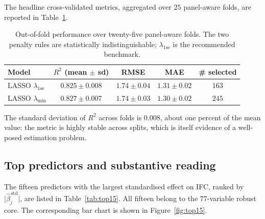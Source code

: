 \documentclass[11pt,a4paper]{article}
\begin{document}
The headline cross-validated metrics, aggregated over \(25\)
panel-aware folds, are reported in Table~\ref{tab:cv}.

\begin{table}[h!]
  \centering
  \begin{tabular}{lcccc}
    \toprule
    Model & \(R^{2}\) (mean \(\pm\) sd) & RMSE & MAE & \# selected \\
    \midrule
    LASSO \(\lambda_{\mathrm{1se}}\) & \(0.825 \pm 0.008\) &
      \(1.74 \pm 0.04\) & \(1.31 \pm 0.02\) & \(163\) \\
    LASSO \(\lambda_{\min}\)         & \(0.827 \pm 0.007\) &
      \(1.74 \pm 0.03\) & \(1.30 \pm 0.02\) & \(245\) \\
    \bottomrule
  \end{tabular}
  \caption{Out-of-fold performance over twenty-five panel-aware folds.
    The two penalty rules are statistically indistinguishable;
    \(\lambda_{\mathrm{1se}}\) is the recommended benchmark.}
  \label{tab:cv}
\end{table}

The standard deviation of \(R^{2}\) across folds is \(0.008\), about
one percent of the mean value: the metric is highly stable across
splits, which is itself evidence of a well-posed estimation problem.

\subsection{Top predictors and substantive reading}

The fifteen predictors with the largest standardised effect on IFC,
ranked by \(\bigl|\hat\beta_{j}^{\,\text{std}}\bigr|\), are listed in
Table~\ref{tab:top15}. All fifteen belong to the
\(77\)-variable robust core. The corresponding bar chart is shown in
Figure~\ref{fig:top15}.
\end{document}
